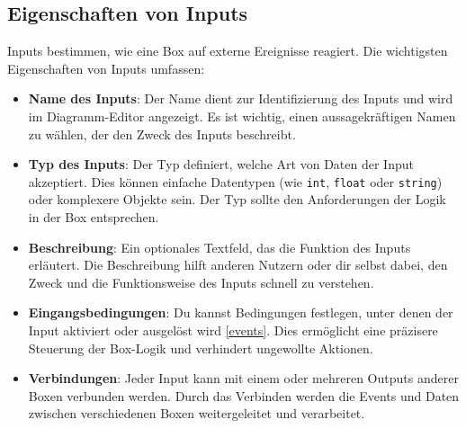 \subsection{Eigenschaften von Inputs}
Inputs bestimmen, wie eine Box auf externe Ereignisse reagiert. Die wichtigsten Eigenschaften von Inputs umfassen:
\begin{itemize}
    \item \textbf{Name des Inputs}: Der Name dient zur Identifizierung des Inputs und wird im Diagramm-Editor angezeigt. Es ist wichtig, einen aussagekräftigen Namen zu wählen, der den Zweck des Inputs beschreibt.
    \item \textbf{Typ des Inputs}: Der Typ definiert, welche Art von Daten der Input akzeptiert. Dies können einfache Datentypen (wie \texttt{int}, \texttt{float} oder \texttt{string}) oder komplexere Objekte sein. Der Typ sollte den Anforderungen der Logik in der Box entsprechen.
    \item \textbf{Beschreibung}: Ein optionales Textfeld, das die Funktion des Inputs erläutert. Die Beschreibung hilft anderen Nutzern oder dir selbst dabei, den Zweck und die Funktionsweise des Inputs schnell zu verstehen.
    \item \textbf{Eingangsbedingungen}: Du kannst Bedingungen festlegen, unter denen der Input aktiviert oder ausgelöst wird \ref{events}. Dies ermöglicht eine präzisere Steuerung der Box-Logik und verhindert ungewollte Aktionen.
    \item \textbf{Verbindungen}: Jeder Input kann mit einem oder mehreren Outputs anderer Boxen verbunden werden. Durch das Verbinden werden die Events und Daten zwischen verschiedenen Boxen weitergeleitet und verarbeitet.
\end{itemize}

